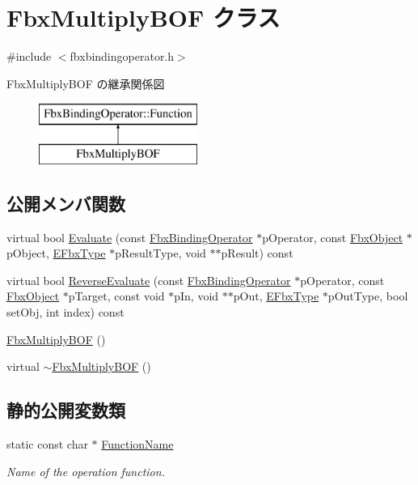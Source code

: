 \hypertarget{class_fbx_multiply_b_o_f}{}\section{Fbx\+Multiply\+B\+OF クラス}
\label{class_fbx_multiply_b_o_f}


{\ttfamily \#include $<$fbxbindingoperator.\+h$>$}

Fbx\+Multiply\+B\+OF の継承関係図\begin{figure}[H]
\begin{center}
\leavevmode
\includegraphics[height=2.000000cm]{class_fbx_multiply_b_o_f}
\end{center}
\end{figure}
\subsection*{公開メンバ関数}
\begin{DoxyCompactItemize}
\item 
virtual bool \hyperlink{class_fbx_multiply_b_o_f_a8626aa9c47369019e5afed776fce72e9}{Evaluate} (const \hyperlink{class_fbx_binding_operator}{Fbx\+Binding\+Operator} $\ast$p\+Operator, const \hyperlink{class_fbx_object}{Fbx\+Object} $\ast$p\+Object, \hyperlink{fbxpropertytypes_8h_a73913a5ddfb20e57c6f25e9e6784bd92}{E\+Fbx\+Type} $\ast$p\+Result\+Type, void $\ast$$\ast$p\+Result) const
\item 
virtual bool \hyperlink{class_fbx_multiply_b_o_f_a54c8a0996a65b3d9bafcbcabf1594745}{Reverse\+Evaluate} (const \hyperlink{class_fbx_binding_operator}{Fbx\+Binding\+Operator} $\ast$p\+Operator, const \hyperlink{class_fbx_object}{Fbx\+Object} $\ast$p\+Target, const void $\ast$p\+In, void $\ast$$\ast$p\+Out, \hyperlink{fbxpropertytypes_8h_a73913a5ddfb20e57c6f25e9e6784bd92}{E\+Fbx\+Type} $\ast$p\+Out\+Type, bool set\+Obj, int index) const
\item 
\hyperlink{class_fbx_multiply_b_o_f_a4311cfe0f6d9e62ec3a673212f152f4a}{Fbx\+Multiply\+B\+OF} ()
\item 
virtual \hyperlink{class_fbx_multiply_b_o_f_a1c6854db53a1dc83c0c30760e14d391c}{$\sim$\+Fbx\+Multiply\+B\+OF} ()
\end{DoxyCompactItemize}
\subsection*{静的公開変数類}
\begin{DoxyCompactItemize}
\item 
static const char $\ast$ \hyperlink{class_fbx_multiply_b_o_f_aac9bacaab22a2dcd18c16b703892d35b}{Function\+Name}
\begin{DoxyCompactList}\small\item\em Name of the operation function. \end{DoxyCompactList}\end{DoxyCompactItemize}


